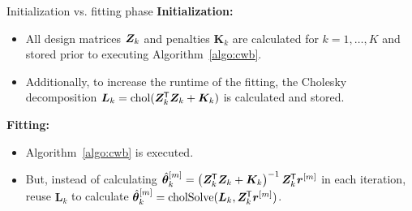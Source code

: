 \documentclass[t,10pt]{beamer}
\newcommand{\penMat}{\bm{K}}
\begin{document}
\begin{frame}{Initialization vs. fitting phase}
  \textbf{Initialization:}
  \begin{itemize}
    \item
      All design matrices $\bm{Z}_k$ and penalties $\penMat_k$ are calculated for $k = 1, \dots, K$ and stored prior to executing Algorithm~\ref{algo:cwb}.
    \item
      Additionally, to increase the runtime of the fitting, the Cholesky decomposition $\bm{L}_k = \operatorname{chol}(\design_k^\tran \design_k + \penMat_k)$ is calculated and stored.
  \end{itemize}
  \textbf{Fitting:}
  \begin{itemize}
    \item
      Algorithm~\ref{algo:cwb} is executed.
    \item
      But, instead of calculating $\hat{\bm{\theta}}^{[m]}_k = \left(\bm{Z}_k^{\mkern-1.5mu\mathsf{T}} \bm{Z}_k + \bm{K}_k\right)^{-1} \bm{Z}^{\mkern-1.5mu\mathsf{T}}_k \bm{r}^{[m]}$ in each iteration, reuse $\bm{L}_k$ to calculate $\hat{\bm{\theta}}^{[m]}_k = \operatorname{cholSolve}(\bm{L}_k, \bm{Z}^{\mkern-1.5mu\mathsf{T}}_k\bm{r}^{[m]})$.
  \end{itemize}

\end{frame}


%
%
%
\end{document}
